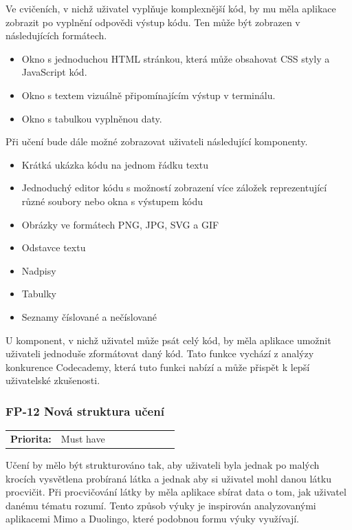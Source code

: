 Ve cvičeních, v nichž uživatel vyplňuje komplexnější kód, by mu měla aplikace zobrazit po vyplnění odpovědi výstup kódu. Ten může být zobrazen v následujících formátech.

\begin{itemize}
    \item Okno s jednoduchou HTML stránkou, která může obsahovat CSS styly a JavaScript kód.
    \item Okno s textem vizuálně připomínajícím výstup v terminálu.
    \item Okno s tabulkou vyplněnou daty.
\end{itemize}

Při učení bude dále možné zobrazovat uživateli následující komponenty.
\begin{itemize}
    \item Krátká ukázka kódu na jednom řádku textu
    \item Jednoduchý editor kódu s možností zobrazení více záložek reprezentující různé soubory nebo okna s výstupem kódu
    \item Obrázky ve formátech PNG, JPG, SVG a GIF
    \item Odstavce textu
    \item Nadpisy
    \item Tabulky
    \item Seznamy číslované a nečíslované
\end{itemize}

U komponent, v nichž uživatel může psát celý kód, by měla aplikace umožnit uživateli jednoduše zformátovat daný kód. Tato funkce vychází z analýzy konkurence Codecademy, která tuto funkci nabízí a může přispět k lepší uživatelské zkušenosti.

\subsubsection{FP-12 Nová struktura učení}

\begin{tabular}{lp{0.7\linewidth}}
    \textbf{Priorita:} & Must have \\
\end{tabular}

Učení by mělo být strukturováno tak, aby uživateli byla jednak po malých krocích vysvětlena probíraná látka a jednak aby si uživatel mohl danou látku procvičit. Při procvičování látky by měla aplikace sbírat data o tom, jak uživatel danému tématu rozumí. Tento způsob výuky je inspirován analyzovanými aplikacemi Mimo a Duolingo, které podobnou formu výuky využívají.

